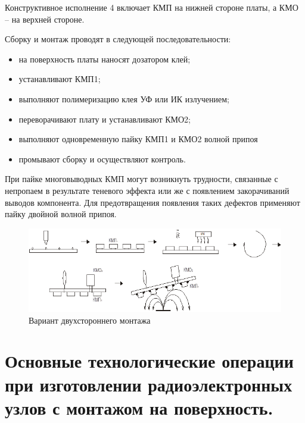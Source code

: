 \documentclass[unicode, 12pt, a4paper, oneside]{article}
\begin{document}
Конструктивное исполнение 4 включает КМП на нижней стороне платы, а КМО – на верхней стороне.

Сборку и монтаж проводят в следующей последовательности:

\begin{itemize}
\item на поверхность платы наносят дозатором клей;
\item устанавливают КМП1;
\item выполняют полимеризацию клея УФ или ИК излучением;
\item переворачивают плату и устанавливают КМО2; 
\item выполняют одновременную пайку КМП1 и КМО2 волной припоя
\item промывают сборку и осуществляют контроль.
\end{itemize}

При пайке многовыводных КМП могут возникнуть трудности, связанные с непропаем в результате теневого эффекта или же с появлением закорачиваний выводов компонента. Для предотвращения появления таких дефектов применяют пайку двойной волной припоя.

\begin{figure}[htbp]
\centering
\includegraphics[width=1.0\textwidth]{85_double.png}
\caption{Вариант двухстороннего монтажа}
\label{fig:85_double}
\end{figure}

\section{Основные технологические операции при изготовлении радиоэлектронных узлов с монтажом на поверхность.}
\end{document}
